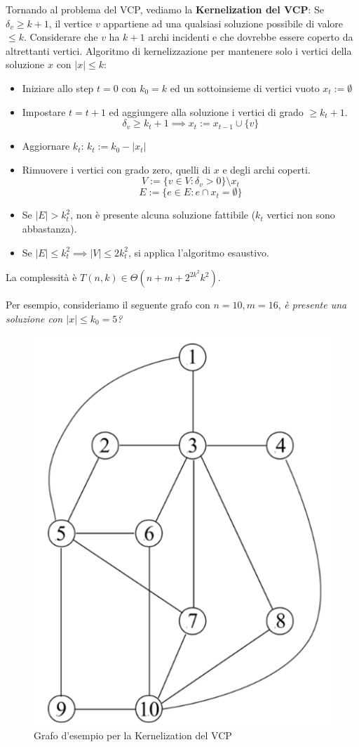 \documentclass{article}
\begin{document}
\noindent Tornando al problema del VCP, vediamo la \textbf{Kernelization del VCP}:
\newline
Se $\delta_v\geq k+1$, il vertice $v$ appartiene ad una qualsiasi soluzione possibile di
valore $\leq k$. Considerare che $v$ ha $k+1$ archi incidenti e che dovrebbe essere
coperto da altrettanti vertici.
\newline
Algoritmo di kernelizzazione per mantenere solo i vertici della soluzione $x$ con $|x|\leq k$:
\begin{itemize}
    \item Iniziare allo step $t=0$ con $k_0=k$ ed un sottoinsieme di vertici vuoto $x_t:=\emptyset$
    \item Impostare $t=t+1$ ed aggiungere alla soluzione i vertici di grado $\geq k_t+1$.
          $$\delta_v\geq k_t+1\implies x_t := x_{t-1}\cup\{v\}$$
    \item Aggiornare $k_t\text{: } k_t:=k_0-|x_t|$
    \item Rimuovere i vertici con grado zero, quelli di $x$ e degli archi coperti.
          $$V:=\{v\in V : \delta_v > 0\}\setminus x_t$$
          $$E:=\{e\in E : e\cap x_t = \emptyset\}$$
    \item Se $|E|>k_t^2$, non è presente alcuna soluzione fattibile ($k_t$ vertici non sono abbastanza).
    \item Se $|E|\leq k_t^2\implies |V|\leq 2k_t^2$, si applica l'algoritmo esaustivo.
\end{itemize}
La complessità è $T(n,k)\in\Theta(n+m+2^{2k^2}k^2)$.

Per esempio, consideriamo il seguente grafo con $n=10,m=16$, \textit{è presente una
    soluzione con $|x|\leq k_0=5$?}
\begin{figure}[H]
    \centering
    \includegraphics[scale=1]{images/kerneliz_0.png}
    \caption{Grafo d'esempio per la Kernelization del VCP}
\end{figure}
\end{document}
